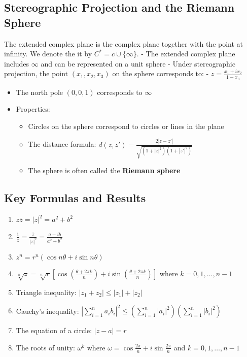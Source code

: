 \documentclass[
]{book}
\providecommand{\tightlist}{%
  \setlength{\itemsep}{0pt}\setlength{\parskip}{0pt}}
\theoremstyle{definition}
\theoremstyle{definition}
\theoremstyle{definition}
\theoremstyle{definition}
\theoremstyle{remark}
\begin{document}
\subsection{Stereographic Projection and the Riemann Sphere}\label{stereographic-projection-and-the-riemann-sphere}

The extended complex plane is the complex plane together with the
point at infinity. We denote the it by \(C^* = c\cup\{\infty\}\).
- The extended complex plane includes \(\infty\) and can be represented on a unit sphere
- Under stereographic projection, the point \((x_1, x_2, x_3)\) on the sphere corresponds to:
- \(z = \frac{x_1 + ix_2}{1 - x_3}\)

\begin{itemize}
\tightlist
\item
  The north pole \((0,0,1)\) corresponds to \(\infty\)
\item
  Properties:

  \begin{itemize}
  \tightlist
  \item
    Circles on the sphere correspond to circles or lines in the plane
  \item
    The distance formula: \(d(z,z') = \frac{2|z-z'|}{\sqrt{(1+|z|^2)(1+|z'|^2)}}\)
  \item
    The sphere is often called the \textbf{Riemann sphere}
  \end{itemize}
\end{itemize}

\subsection{Key Formulas and Results}\label{key-formulas-and-results}

\begin{enumerate}
\def\labelenumi{\arabic{enumi}.}
\item
  \(z\bar{z} = |z|^2 = a^2 + b^2\)
\item
  \(\frac{1}{z} = \frac{\bar{z}}{|z|^2} = \frac{a - ib}{a^2 + b^2}\)
\item
  \(z^n = r^n(\cos n\theta + i\sin n\theta)\)
\item
  \(\sqrt[n]{z} = \sqrt[n]{r}\left[\cos\left(\frac{\theta + 2\pi k}{n}\right) + i\sin\left(\frac{\theta + 2\pi k}{n}\right)\right]\) where \(k = 0, 1, \ldots, n-1\)
\item
  Triangle inequality: \(|z_1 + z_2| \leq |z_1| + |z_2|\)
\item
  Cauchy's inequality: \(\left|\sum_{i=1}^{n} a_i\bar{b}_i\right|^2 \leq \left(\sum_{i=1}^{n}|a_i|^2\right)\left(\sum_{i=1}^{n}|b_i|^2\right)\)
\item
  The equation of a circle: \(|z - a| = r\)
\item
  The roots of unity: \(\omega^k\) where \(\omega = \cos\frac{2\pi}{n} + i\sin\frac{2\pi}{n}\) and \(k = 0, 1, \ldots, n-1\)
\end{enumerate}
\end{document}
